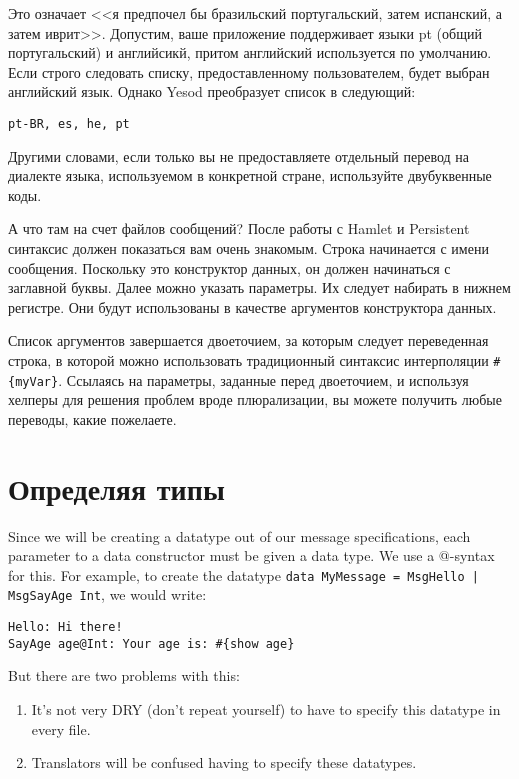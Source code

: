 Это означает <<я предпочел бы бразильский португальский, затем испанский, а затем иврит>>. Допустим, ваше приложение поддерживает языки pt (общий португальский) и английсикй, притом английский используется по умолчанию. Если строго следовать списку, предоставленному пользователем, будет выбран английский язык. Однако Yesod преобразует список в следующий:

\begin{lstlisting}
pt-BR, es, he, pt
\end{lstlisting}

Другими словами, если только вы не предоставляете отдельный перевод на диалекте языка, используемом в конкретной стране, используйте двубуквенные коды. %

А что там на счет файлов сообщений? После работы с Hamlet и Persistent синтаксис должен показаться вам очень знакомым. Строка начинается с имени сообщения. Поскольку это конструктор данных, он должен начинаться с заглавной буквы. Далее можно указать параметры. Их следует набирать в нижнем регистре. Они будут использованы в качестве аргументов конструктора данных.

Список аргументов завершается двоеточием, за которым следует переведенная строка, в которой можно использовать традиционный синтаксис интерполяции \lstinline'#{myVar}'. Ссылаясь на параметры, заданные перед двоеточием, и используя хелперы для решения проблем вроде плюрализации, вы можете получить любые переводы, какие пожелаете.

\section{Определяя типы} %

Since we will be creating a datatype out of our message specifications, each parameter to a data constructor must be given a data type. We use a @-syntax for this. For example, to create the datatype \lstinline'data MyMessage = MsgHello | MsgSayAge Int', we would write:

\begin{lstlisting}
Hello: Hi there!
SayAge age@Int: Your age is: #{show age}
\end{lstlisting}

But there are two problems with this:

\begin{enumerate}
  \item It's not very DRY (don't repeat yourself) to have to specify this datatype in every file.
  \item Translators will be confused having to specify these datatypes.
\end{enumerate}

